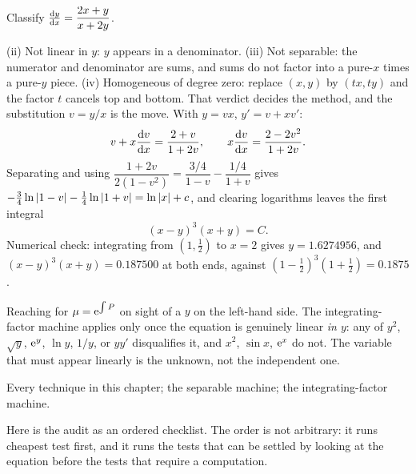 \begin{worked}
Classify $\frac{\mathrm{d}y}{\mathrm{d}x}=\dfrac{2x+y}{x+2y}$.

(ii) Not linear in $y$: $y$ appears in a denominator. (iii) Not separable: the numerator and denominator are sums, and sums do not factor into a pure-$x$ times a pure-$y$ piece. (iv) Homogeneous of degree zero: replace $(x,y)$ by $(tx,ty)$ and the factor $t$ cancels top and bottom. That verdict decides the method, and the substitution $v=y/x$ is the move. With $y=vx$, $y'=v+xv'$:
\[v+x\frac{\mathrm{d}v}{\mathrm{d}x}=\frac{2+v}{1+2v},\qquad x\frac{\mathrm{d}v}{\mathrm{d}x}=\frac{2-2v^{2}}{1+2v}.\]
Separating and using $\dfrac{1+2v}{2(1-v^{2})}=\dfrac{3/4}{1-v}-\dfrac{1/4}{1+v}$ gives $-\tfrac34\ln\left\lvert 1-v\right\rvert-\tfrac14\ln\left\lvert 1+v\right\rvert=\ln\left\lvert x\right\rvert+c$, and clearing logarithms leaves the first integral
\[(x-y)^{3}(x+y)=C.\]
Numerical check: integrating from $(1,\tfrac12)$ to $x=2$ gives $y=1.6274956$, and $(x-y)^{3}(x+y)=0.187500$ at both ends, against $(1-\tfrac12)^{3}(1+\tfrac12)=0.1875$.
\end{worked}

\begin{trap}
Reaching for $\mu=\mathrm{e}^{\int P}$ on sight of a $y$ on the left-hand side. The integrating-factor machine applies only once the equation is genuinely linear \emph{in $y$}: any of $y^{2}$, $\sqrt y$, $\mathrm{e}^{y}$, $\ln y$, $1/y$, or $yy'$ disqualifies it, and $x^{2}$, $\sin x$, $\mathrm{e}^{x}$ do not. The variable that must appear linearly is the unknown, not the independent one.
\end{trap}

\begin{seealsob}Every technique in this chapter; the separable machine; the integrating-factor machine.\end{seealsob}

Here is the audit as an ordered checklist. The order is not arbitrary: it runs cheapest test first, and it runs the tests that can be settled by looking at the equation before the tests that require a computation.

